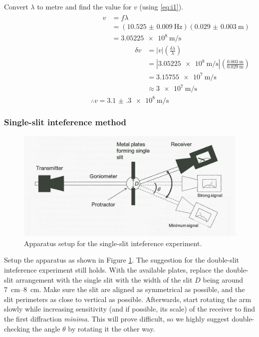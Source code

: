\documentclass[letter,12pt]{article}
\newcommand{\tlambda}{\(\lambda\) }
\newcommand{\ttheta}{\(\theta\) }
\numberwithin{equation}{section}
\numberwithin{figure}{section}
\numberwithin{table}{section}
\begin{document}
Convert \tlambda to metre and find the value for \(v\) (using \eqref{eq:i1}).
\begin{align*}
  \begin{split}
  v &= f \lambda \\
  &= (\SI{10.525(9)}{\hertz})(\SI{0.029(3)}{\m}) \\
  &= \SI{3.05225e8}{\metre\per\second}
  \end{split}
  \begin{split}
    \delta v &= |v|\left( \frac{\delta \lambda}{\lambda} \right) \\
    &= |\SI{3.05225e8}{\metre\per\second}|\left( \frac{\SI{0.003}{\m}}{\SI{0.029}{\m}} \right) \\
    &= \SI{3.15755e7}{\m\per\s} \\
    &\approx \SI{3e7}{\m\per\s}
  \end{split}
\end{align*}
\[\therefore v = \SI{3.1(3)e8}{\m\per\s}\]

\subsubsection{Single-slit inteference method}
\begin{figure}[!ht]
  \centering
  \includegraphics[width=\textwidth]{Single-slit.png}
  \caption{Apparatus setup for the single-slit inteference experiment.}
  \label{fig:e2}
\end{figure}

Setup the apparatus as shown in Figure \ref{fig:e2}. The suggestion for the double-slit inteference experiment still holds. With the available plates, replace the double-slit arrangement with the single slit with the width of the slit \(D\) being around \SIrange{7}{8}{\cm}. Make sure the slit are aligned as symmetrical as possible, and the slit perimeters as close to vertical as possible. Afterwards, start rotating the arm slowly while increasing sensitivity (and if possible, its scale) of the receiver to find the first diffraction \emph{minima}. This will prove difficult, so we highly suggest double-checking the angle \ttheta by rotating it the other way.
\end{document}
